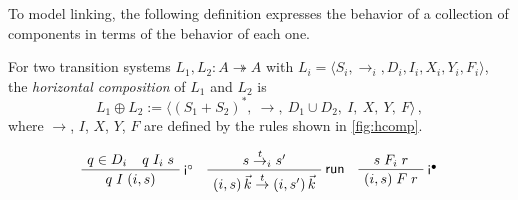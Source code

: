 \documentclass[sigplan,screen]{acmart}
\newcommand{\figsize}{\small}
\newcommand{\kw}[1]{\ensuremath{ \mathsf{#1} }}
\newcommand{\que}{\circ}
\newcommand{\ans}{\bullet}
\begin{document}
To model linking,
the following definition
expresses the behavior
of a collection of components
in terms of the behavior of each one.

\begin{definition} \label{def:hcomp} %
For two transition systems $L_1, L_2 : A \twoheadrightarrow A$
with
$L_i = \langle S_i, {\rightarrow}_i, D_i, I_i, X_i, Y_i, F_i \rangle$,
the \emph{horizontal composition} of $L_1$ and $L_2$
is
\[
    L_1 \oplus L_2 :=
    \big\langle
      (S_1 + S_2)^*, \: {\rightarrow}, \:
      D_1 \cup D_2, \:
      I, \: X, \: Y, \: F
    \big\rangle
  \,,
\]
where %
$\rightarrow$, $I$, $X$, $Y$, $F$
are defined by
the rules shown in \autoref{fig:hcomp}.
\end{definition}

\begin{figure} %
  \figsize
    \begin{gather*}
        \AxiomC{$q \in D_i$}
        \AxiomC{\hspace{-1.5em} $q \mathrel{I_i} s$}
        \RightLabel{$\kw{i}^\que$}
        \BinaryInfC{$q \mathrel{I} (i, s)$}
        \DisplayProof
        \quad
        \AxiomC{$s \stackrel{t}{\rightarrow}_i s'$}
        \RightLabel{$\kw{run}$}
        \UnaryInfC{$
            (i, s) \, \vec{k}
            \stackrel{t}{\rightarrow}
            (i, s') \, \vec{k}$}
        \DisplayProof
        \quad
        \AxiomC{$s \mathrel{F_i} r$}
        \RightLabel{$\kw{i}^\ans$}
        \UnaryInfC{$(i, s) \mathrel{F} r$}
        \DisplayProof
        \\[0.8em]
        \AxiomC{$s \mathrel{X_i} q$}

\end{gather*}
\end{figure}
\end{document}

